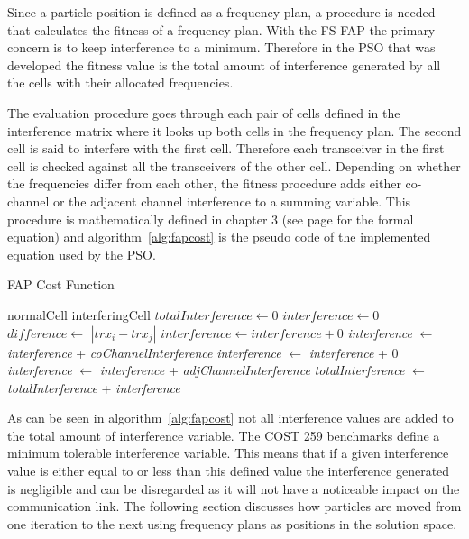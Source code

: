 Since a particle position is defined as a frequency plan, a procedure is needed that calculates the fitness of a frequency plan. With the \gls{FS-FAP} the primary concern is to keep interference to a minimum. Therefore in the \gls{PSO} that was developed the fitness value is the total amount of interference generated by all the cells with their allocated frequencies. 

The evaluation procedure goes through each pair of cells defined in the interference matrix where it looks up both cells in the frequency plan. The second cell is said to interfere with the first cell. Therefore each transceiver in the first cell is checked against all the transceivers of the other cell. Depending on whether the frequencies differ from each other, the fitness procedure adds either co-channel or the adjacent channel interference to a summing variable. This procedure is mathematically defined in chapter 3 (see page \pageref{E:costFunction} for the formal equation) and algorithm~\ref{alg:fapcost} is the pseudo code of the implemented equation used by the \gls{PSO}. 

\begin{algorithm}
\caption{FAP Cost Function}
\label{alg:fapcost}
	\begin{algorithmic}[1]
	\Require normalCell
	\Require interferingCell
	\State $totalInterference \leftarrow $0
			\State $interference \leftarrow 0$
			\State $difference \leftarrow$ $|trx_i - trx_j|$
					\State $interference \leftarrow interference + 0$
				\Else
                \State \emph{interference} $\leftarrow$ \emph{interference} + \emph{coChannelInterference}
				\EndIf
			\Else
                    \State \emph{interference} $\leftarrow$ \emph{interference} + 0
					\Else
                    \State \emph{interference} $\leftarrow$ \emph{interference} + \emph{adjChannelInterference}
					\EndIf
				\EndIf
			\EndIf
            \State \emph{totalInterference} $\leftarrow$ \emph{totalInterference} + \emph{interference}
		\EndFor
	\EndFor
	\end{algorithmic}
\end{algorithm}

As can be seen in algorithm~\ref{alg:fapcost} not all interference values are added to the total amount of interference variable. The COST 259 benchmarks define a minimum tolerable interference variable. This means that if a given interference value is either equal to or less than this defined value the interference generated is negligible and can be disregarded as it will not have a noticeable impact on the communication link. The following section discusses how particles are moved from one iteration to the next using frequency plans as positions in the solution space.

